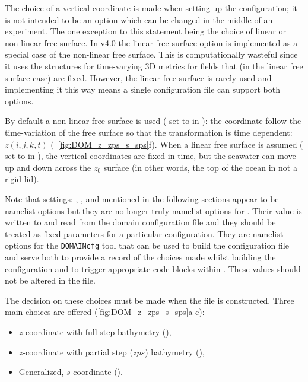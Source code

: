 \documentclass[../main/NEMO_manual]{subfiles}
\begin{document}
The choice of a vertical coordinate is made when setting up the configuration;
it is not intended to be an option which can be changed in the middle of an experiment.
The one exception to this statement being the choice of linear or non-linear free surface.
In v4.0 the linear free surface option is implemented as
a special case of the non-linear free surface.
This is computationally wasteful since it uses the structures for time-varying 3D metrics
for fields that (in the linear free surface case) are fixed.
However, the linear free-surface is rarely used and
implementing it this way means a single configuration file can support both options.

By default a non-linear free surface is used
( set to  in ):
the coordinate follow the time-variation of the free surface so that
the transformation is time dependent: $z(i,j,k,t)$ (\eg\ \autoref{fig:DOM_z_zps_s_sps}f).
When a linear free surface is assumed
( set to  in ),
the vertical coordinates are fixed in time, but
the seawater can move up and down across the $z_0$ surface
(in other words, the top of the ocean in not a rigid lid).

Note that settings:
, ,  and 
mentioned in the following sections appear to be namelist options but
they are no longer truly namelist options for \NEMO.
Their value is written to and read from the domain configuration file and
they should be treated as fixed parameters for a particular configuration.
They are namelist options for the \texttt{DOMAINcfg} tool that can be used to
build the configuration file and serve both to provide a record of the choices made whilst
building the configuration and to trigger appropriate code blocks within \NEMO.
These values should not be altered in the  file.

\medskip
The decision on these choices must be made when the  file is constructed.
Three main choices are offered (\autoref{fig:DOM_z_zps_s_sps}a-c):

\begin{itemize}
\item $z$-coordinate with full step bathymetry (),
\item $z$-coordinate with partial step ($zps$) bathymetry (),
\item Generalized, $s$-coordinate ().
\end{itemize}
\end{document}
